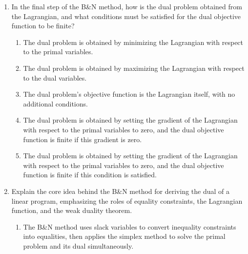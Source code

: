 \documentclass{article}%
\begin{document}
\begin{enumerate}
\begin{enumerate}%
\item It guarantees that the primal and dual problems always have the same optimal solution.%
\item It states that the optimal value of the primal problem is always greater than or equal to the optimal value of the dual problem.%
\item It provides a bound on the optimal solution of the primal problem using the feasible solutions of the dual problem.%
\item It ensures that the dual problem always has a feasible solution.%
\item It is irrelevant to the B\&N method, which focuses solely on the primal problem.%
\end{enumerate}%
\vspace{1em}%
\item In the final step of the B\&N method, how is the dual problem obtained from the Lagrangian, and what conditions must be satisfied for the dual objective function to be finite?%
\begin{enumerate}%
\item The dual problem is obtained by minimizing the Lagrangian with respect to the primal variables.%
\item The dual problem is obtained by maximizing the Lagrangian with respect to the dual variables.%
\item The dual problem's objective function is the Lagrangian itself, with no additional conditions.%
\item The dual problem is obtained by setting the gradient of the Lagrangian with respect to the primal variables to zero, and the dual objective function is finite if this gradient is zero.%
\item The dual problem is obtained by setting the gradient of the Lagrangian with respect to the primal variables to zero, and the dual objective function is finite if this condition is satisfied.%
\end{enumerate}%
\vspace{1em}%
\item Explain the core idea behind the B\&N method for deriving the dual of a linear program, emphasizing the roles of equality constraints, the Lagrangian function, and the weak duality theorem.%
\begin{enumerate}%
\item The B\&N method uses slack variables to convert inequality constraints into equalities, then applies the simplex method to solve the primal problem and its dual simultaneously.%

\end{enumerate}
\end{enumerate}
\end{document}
